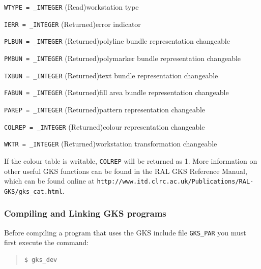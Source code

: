 \documentclass[twoside,11pt]{article}
\newcommand{\htmladdnormallink}[2]{#1}
\newcommand{\latex}[1]{#1}
\begin{document}
\begin{description}
\item {\tt WTYPE = \_INTEGER} (Read)\newline workstation type
\item {\tt IERR = \_INTEGER} (Returned)\newline error indicator
\item {\tt PLBUN = \_INTEGER} (Returned)\newline polyline bundle representation changeable
\item {\tt PMBUN = \_INTEGER} (Returned)\newline polymarker bundle representation changeable
\item {\tt TXBUN = \_INTEGER} (Returned)\newline text bundle representation changeable
\item {\tt FABUN = \_INTEGER} (Returned)\newline fill area bundle representation changeable
\item {\tt PAREP = \_INTEGER} (Returned)\newline pattern representation changeable
\item {\tt COLREP = \_INTEGER} (Returned)\newline colour representation changeable
\item {\tt WKTR = \_INTEGER} (Returned)\newline workstation transformation changeable
\end{description}

If the colour table is writable, {\tt COLREP} will be returned as 1. More information on other useful GKS functions can be found in the \htmladdnormallink{RAL GKS Reference Manual}{http://www.itd.clrc.ac.uk/Publications/RAL-GKS/gks_cat.html}\latex{, which can be found online at {\tt http://www.itd.clrc.ac.uk/Publications/RAL-GKS/gks\_cat.html}}.

\subsubsection{Compiling and Linking GKS programs}

Before compiling a program that uses the GKS include file {\tt GKS\_PAR} you must first execute the command: 

\small
\begin{quote}
\begin{verbatim}
$ gks_dev 
\end{verbatim}
\end{quote}
\normalsize
\end{document}
